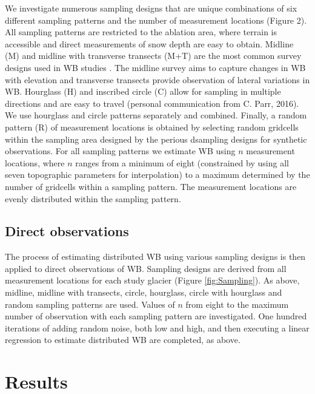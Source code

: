 \documentclass[twocolumn,letterpaper]{igs}
\begin{document}
We investigate numerous sampling designs that are unique combinations of six different sampling patterns and the number of measurement locations (Figure 2). All sampling patterns are restricted to the ablation area, where terrain is accessible and direct measurements of snow depth are easy to obtain. Midline (M) and midline with transverse transects (M+T) are the most common survey designs used in WB studies \citep[e.g.][]{Kaser2002,Machguth2006}. The midline survey aims to capture changes in WB with elevation and transverse transects provide observation of lateral variations in WB. Hourglass (H) and inscribed circle (C) allow for sampling in multiple directions and are easy to travel (personal communication from C. Parr, 2016). We use hourglass and circle patterns separately and combined. Finally, a random pattern (R) of measurement locations is obtained by selecting random gridcells within the sampling area designed by the perious dsampling designs for synthetic observations. For all sampling patterns we estimate WB using $n$ measurement locations, where $n$ ranges from a minimum of eight (constrained by using all seven topographic parameters for interpolation) to a maximum determined by the number of gridcells within a sampling pattern. The measurement locations are evenly distributed within the sampling pattern. 

\subsection{Direct observations}

The process of estimating distributed WB using various sampling designs is then applied to direct observations of WB. Sampling designs are derived from all measurement locations for each study glacier (Figure \ref{fig:Sampling}). As above, midline, midline with transects, circle, hourglass, circle with hourglass and random sampling patterns are used. Values of $n$ from eight to the maximum number of observation with each sampling pattern are investigated. One hundred iterations of adding random noise, both low and high, and then executing a linear regression to estimate distributed WB are completed, as above. 

\section{Results }
\end{document}
